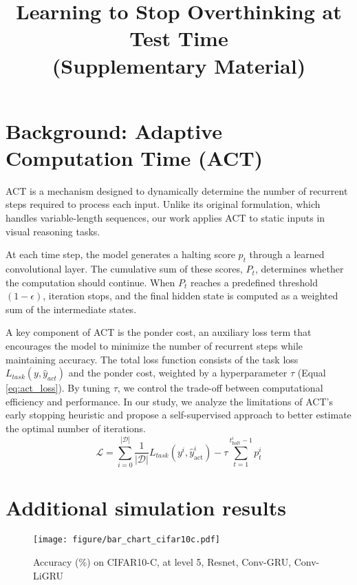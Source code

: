 \onecolumn
\title{Learning to Stop Overthinking at Test Time\\(Supplementary Material)}
\maketitle

\appendix

\section{Background: Adaptive Computation Time (ACT)}
\label{sec:background}
ACT \cite{Graves2016AdaptiveComutationTime} is a mechanism designed to dynamically determine the number of recurrent steps required to process each input. Unlike its original formulation, which handles variable-length sequences, our work applies ACT to static inputs in visual reasoning tasks.  

At each time step, the model generates a halting score $p_t$ through a learned convolutional layer. The cumulative sum of these scores, $P_t$, determines whether the computation should continue. When $P_t$ reaches a predefined threshold $(1 - \epsilon)$, iteration stops, and the final hidden state is computed as a weighted sum of the intermediate states.  

A key component of ACT is the ponder cost, an auxiliary loss term that encourages the model to minimize the number of recurrent steps while maintaining accuracy. The total loss function consists of the task loss $L_{task}(y, \hat{y}_{act})$ and the ponder cost, weighted by a hyperparameter $\tau$ (Equal \ref{eq:act_loss}). By tuning $\tau$, we control the trade-off between computational efficiency and performance. In our study, we analyze the limitations of ACT’s early stopping heuristic and propose a self-supervised approach to better estimate the optimal number of iterations.  
\begin{equation}
    \mathcal{L} = \sum_{i=0}^{|\mathcal{D}|} \frac{1}{|\mathcal{D}|} L_{task}(y^i , \hat{y}^i_{\text{act}}) - \tau \sum_{t=1}^{t^i_{\text{halt}} - 1} p^i_t
    \label{eq:act_loss}
\end{equation}


\section{Additional simulation results}
\label{sec:addition_result}
\begin{figure*}[htbp]
    \centering
    \texttt{[image: figure/bar\_chart\_cifar10c.pdf]}
        \caption{Accuracy (\%) on CIFAR10-C, at level 5, Resnet, Conv-GRU, Conv-LiGRU}
        \label{fig:bar_chart_cifar10c}
\end{figure*}

